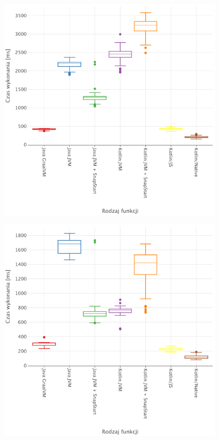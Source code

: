 \begin{figure}[p]
    \begin{minipage}[t]{0.48\textwidth}
        \centering
        \includegraphics[width=\linewidth]{charts/results/cold-start-boxplot-256.png}
        \label{fig:cold_start_128}
    \end{minipage}%
    \hfill %
    \begin{minipage}[t]{0.48\textwidth}
        \centering
        \includegraphics[width=\linewidth]{charts/results/cold-start-boxplot-1024.png}

\end{minipage}
\end{figure}
